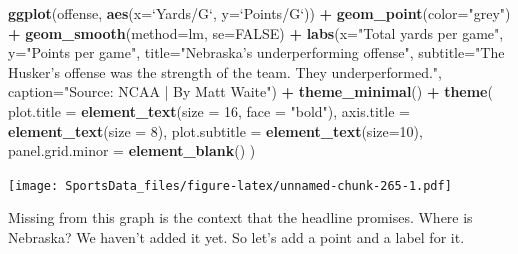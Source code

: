 \documentclass[]{book}
\newenvironment{Shaded}{\begin{snugshade}}{\end{snugshade}}
\newcommand{\DataTypeTok}[1]{\textcolor[rgb]{0.13,0.29,0.53}{#1}}
\newcommand{\DecValTok}[1]{\textcolor[rgb]{0.00,0.00,0.81}{#1}}
\newcommand{\KeywordTok}[1]{\textcolor[rgb]{0.13,0.29,0.53}{\textbf{#1}}}
\newcommand{\NormalTok}[1]{#1}
\newcommand{\OperatorTok}[1]{\textcolor[rgb]{0.81,0.36,0.00}{\textbf{#1}}}
\newcommand{\OtherTok}[1]{\textcolor[rgb]{0.56,0.35,0.01}{#1}}
\newcommand{\StringTok}[1]{\textcolor[rgb]{0.31,0.60,0.02}{#1}}
\begin{document}
\begin{Shaded}
\begin{Highlighting}[]
\KeywordTok{ggplot}\NormalTok{(offense, }\KeywordTok{aes}\NormalTok{(}\DataTypeTok{x=}\StringTok{`}\DataTypeTok{Yards/G}\StringTok{`}\NormalTok{, }\DataTypeTok{y=}\StringTok{`}\DataTypeTok{Points/G}\StringTok{`}\NormalTok{)) }\OperatorTok{+}\StringTok{ }
\StringTok{  }\KeywordTok{geom_point}\NormalTok{(}\DataTypeTok{color=}\StringTok{"grey"}\NormalTok{) }\OperatorTok{+}\StringTok{ }\KeywordTok{geom_smooth}\NormalTok{(}\DataTypeTok{method=}\NormalTok{lm, }\DataTypeTok{se=}\OtherTok{FALSE}\NormalTok{) }\OperatorTok{+}\StringTok{ }
\StringTok{  }\KeywordTok{labs}\NormalTok{(}\DataTypeTok{x=}\StringTok{"Total yards per game"}\NormalTok{, }\DataTypeTok{y=}\StringTok{"Points per game"}\NormalTok{, }\DataTypeTok{title=}\StringTok{"Nebraska's underperforming offense"}\NormalTok{, }\DataTypeTok{subtitle=}\StringTok{"The Husker's offense was the strength of the team. They underperformed."}\NormalTok{, }\DataTypeTok{caption=}\StringTok{"Source: NCAA | By Matt Waite"}\NormalTok{) }\OperatorTok{+}\StringTok{ }
\StringTok{  }\KeywordTok{theme_minimal}\NormalTok{() }\OperatorTok{+}\StringTok{ }
\StringTok{  }\KeywordTok{theme}\NormalTok{(}
    \DataTypeTok{plot.title =} \KeywordTok{element_text}\NormalTok{(}\DataTypeTok{size =} \DecValTok{16}\NormalTok{, }\DataTypeTok{face =} \StringTok{"bold"}\NormalTok{),}
    \DataTypeTok{axis.title =} \KeywordTok{element_text}\NormalTok{(}\DataTypeTok{size =} \DecValTok{8}\NormalTok{), }
    \DataTypeTok{plot.subtitle =} \KeywordTok{element_text}\NormalTok{(}\DataTypeTok{size=}\DecValTok{10}\NormalTok{), }
    \DataTypeTok{panel.grid.minor =} \KeywordTok{element_blank}\NormalTok{()}
\NormalTok{    ) }
\end{Highlighting}
\end{Shaded}

\texttt{[image: SportsData\_files/figure-latex/unnamed-chunk-265-1.pdf]}

Missing from this graph is the context that the headline promises. Where is Nebraska? We haven't added it yet. So let's add a point and a label for it.
\end{document}
